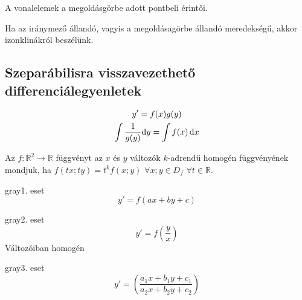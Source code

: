 \documentclass[main.tex]{subfiles}
\begin{document}

A vonalelemek a megoldásgörbe adott pontbeli érintői.

Ha az iránymező állandó, vagyis a megoldásagörbe
állandó meredekségű, akkor izonklinákról beszélünk.






\subsection{Szeparábilisra visszavezethető differenciálegyenletek}

\begin{gather*}
  y' = f(x)g(y)
  \\
  \int \frac{1}{g(y)} \mathrm{d} y = \int f(x) \, \mathrm{d} x
\end{gather*}




Az $f : \mathbb{R}^2 \rightarrow \mathbb{R}$ függvényt
az $x$ és $y$ változók $k$-adrendű homogén függvényének
mondjuk, ha $f \left( tx; ty \right) = t^k f(x; y)$
$\forall x;y \in D_f$ $\forall t \in \mathbb{R}$.

\vspace{1.5em}


\begin{minipage}[c]{.31\textwidth}
  \begin{cbox}{gray}{1. eset}
    \[
      y' = f \left( ax + by + c \right)
    \]
    \vfill
  \end{cbox}
\end{minipage}\hfill
\begin{minipage}[c]{.31\textwidth}
  \begin{cbox}{gray}{2. eset}
    \[
      y' = f \left( \frac{y}{x} \right)
    \]
    Változóiban homogén
    \vfill
  \end{cbox}
\end{minipage}\hfill
\begin{minipage}[c]{.31\textwidth}
  \begin{cbox}{gray}{3. eset}
    \[
      y' = \left( \frac{
        a_1 x + b_1 y + c_1
      }{
        a_2 x + b_2 y + c_2
      } \right)
    \]
  \end{cbox}
\end{minipage}\hfill
\end{document}
